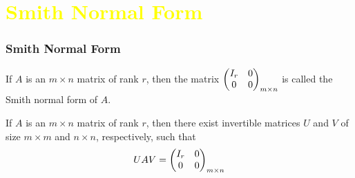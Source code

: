 \documentclass[pdf,9pt]{beamer}
\begin{document}
\section[\textcolor{yellow}{}]{\textcolor{yellow}{Smith Normal Form}}
\begin{frame}[fragile]
\frametitle{Smith Normal Form}
\pause
\begin{definition}
    If $A$ is an $m\times n$ matrix of rank $r$, then the matrix
    $\begin{pmatrix} I_r & 0 \cr 0 & 0 \end{pmatrix}_{m \times n}$
    is called the \alert{Smith normal form} of $A$.
\end{definition}
\vfill
\begin{theorem}
    If $A$ is an $m\times n$ matrix of rank $r$, then there exist invertible
    matrices $U$ and $V$ of size $m \times m$ and $n \times n$, respectively,
    such that
    \begin{align*}
        UAV = \begin{pmatrix} I_r & 0 \cr 0 & 0 \end{pmatrix}_{m \times n}
    \end{align*}
\end{theorem}
\end{frame}
\end{document}
